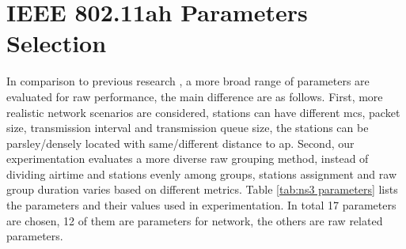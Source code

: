 \section{IEEE 802.11ah Parameters Selection \label{sec:parameters_selection}}





In comparison to previous research \cite{WoWMoM2016}, a more broad range of parameters are evaluated for \gls{raw} performance, the main difference are as follows. First, more realistic network scenarios are considered, stations can have different \gls{mcs}, packet size, transmission interval and transmission queue size, the stations can be parsley/densely located with same/different distance to \gls{ap}. Second, our experimentation evaluates a more diverse \gls{raw} grouping method, instead of dividing airtime and stations evenly among groups, stations assignment and \gls{raw} group duration varies based on different metrics. Table \ref{tab:ns3 parameters} lists the parameters and their values used in experimentation. In total 17 parameters are chosen, 12 of them are parameters for network, the others are \gls{raw} related parameters.

